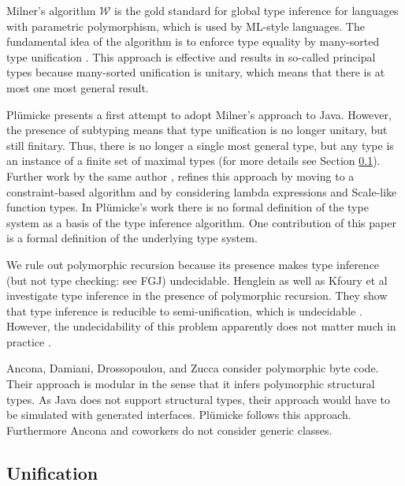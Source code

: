 Milner's algorithm $\mathcal{W}$ \cite{DBLP:journals/jcss/Milner78} is
the gold standard for global type inference for languages with 
parametric polymorphism, which is used by ML-style languages. The fundamental idea
of the algorithm is to enforce type equality by many-sorted type
unification \cite{Rob65,MM82}. This approach is effective and results
in so-called principal types because many-sorted unification is
unitary, which means that there is at most one most general result.

Pl\"umicke \cite{Plue07_3} presents a first attempt to adopt Milner's
approach to Java. However, the presence of subtyping means that type
unification is no longer unitary, but still finitary. Thus, there is
no longer a single most general type, but any type is an instance of a
finite set of maximal types (for more details see Section
\ref{sec:unification}). Further work by the same author
\cite{plue15_2,plue17_2}, 
refines this approach by moving to a constraint-based algorithm and by
considering lambda expressions and Scale-like function types.
In Pl\"umicke's work there is no formal definition of the type system as a basis
of the type inference algorithm. One contribution of this paper is a
formal definition of the underlying type system. 

We rule out polymorphic recursion because its presence makes type
inference (but not type checking: see FGJ) undecidable. Henglein
\cite{DBLP:journals/toplas/Henglein93} as well as Kfoury et al
\cite{DBLP:journals/toplas/KfouryTU93} investigate type inference in
the presence of polymorphic recursion. They show that type inference
is reducible to semi-unification, which is undecidable
\cite{DBLP:journals/iandc/KfouryTU93}. However, the undecidability of
this problem apparently does not matter much in practice
\cite{DBLP:journals/tcs/EmmsL99}. 

Ancona, Damiani, Drossopoulou, and Zucca \cite{ADDZ05} consider polymorphic byte
code. Their approach is modular in the sense that it infers
polymorphic structural types. As {Java} does not support structural
types, their approach would have to be simulated with generated
interfaces. Pl\"umicke \cite{plue16_1} follows this
approach. Furthermore Ancona and coworkers do not consider generic classes. 



\subsection{Unification}
\label{sec:unification}

